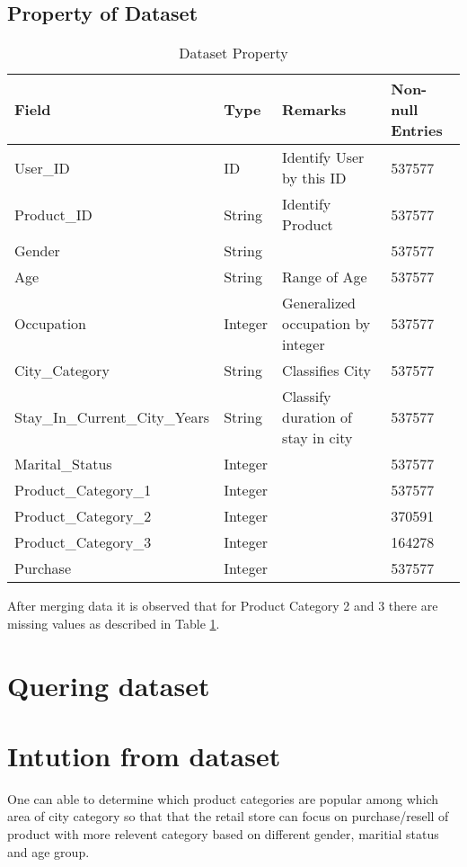 \documentclass[paper=letter, fontsize=12pt]{article}
\begin{document}
\subsection{Property of Dataset}
\begin{table}[H]
	\centering
	\begin{tabular}{l  l  l  l}
		Field & Type & Remarks & Non-null Entries
		\\ \hline \hline
		User\_ID & ID & Identify User by this ID & 537577
		\\
		Product\_ID & String & Identify Product & 537577
		\\
		Gender & String &  & 537577
		\\
		Age & String & Range of Age & 537577
		\\
		Occupation & Integer & Generalized occupation by integer & 537577
		\\
		City\_Category & String & Classifies City & 537577
		\\
		Stay\_In\_Current\_City\_Years & String & Classify duration of stay in city & 537577
		\\
		Marital\_Status & Integer &  & 537577
		\\
		Product\_Category\_1 & Integer &  & 537577
		\\
		Product\_Category\_2 & Integer &  & 370591
		\\
		Product\_Category\_3 & Integer &  & 164278
		\\
		Purchase & Integer &  & 537577
	\end{tabular}
    \caption{Dataset Property}
    \label{table:data-observation}
\end{table}

After merging data it is observed that for Product Category 2 and 3 there are missing values as described in Table \ref{table:data-observation}.

\section{Quering dataset}



\section{Intution from dataset}
One can able to determine which product categories are popular among which area of city category so that that the retail store can focus on purchase/resell of product with more relevent category based on different gender, maritial status and age group.
\end{document}
